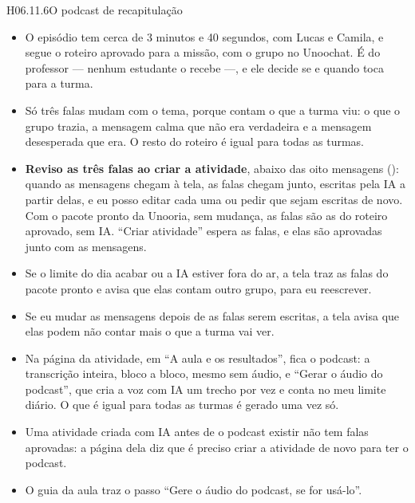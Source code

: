 \begin{historia}{H06.11.6}{O podcast de recapitulação}{\parcial}
\aceite
\begin{itemize}
  \item O episódio tem cerca de 3 minutos e 40 segundos, com Lucas e Camila, e
    segue o roteiro aprovado para a missão, com o grupo no Unoochat. É do
    professor --- nenhum estudante o recebe ---, e ele decide se e quando toca
    para a turma.
  \item Só três falas mudam com o tema, porque contam o que a turma viu: o que
    o grupo trazia, a mensagem calma que não era verdadeira e a mensagem
    desesperada que era. O resto do roteiro é igual para todas as turmas.
  \item \textbf{Reviso as três falas ao criar a atividade}, abaixo das oito
    mensagens (): quando as mensagens chegam à tela, as falas
    chegam junto, escritas pela IA a partir delas, e eu posso editar cada uma
    ou pedir que sejam escritas de novo. Com o pacote pronto da Unooria, sem
    mudança, as falas são as do roteiro aprovado, sem IA. \enquote{Criar
    atividade} espera as falas, e elas são aprovadas junto com as mensagens.
  \item Se o limite do dia acabar ou a IA estiver fora do ar, a tela traz as
    falas do pacote pronto e avisa que elas contam outro grupo, para eu
    reescrever.
  \item Se eu mudar as mensagens depois de as falas serem escritas, a tela
    avisa que elas podem não contar mais o que a turma vai ver.
  \item Na página da atividade, em \enquote{A aula e os resultados}, fica o
    podcast: a transcrição inteira, bloco a bloco, mesmo sem áudio, e
    \enquote{Gerar o áudio do podcast}, que cria a voz com IA um trecho por
    vez e conta no meu limite diário. O que é igual para todas as turmas é
    gerado uma vez só.
  \item Uma atividade criada com IA antes de o podcast existir não tem falas
    aprovadas: a página dela diz que é preciso criar a atividade de novo para
    ter o podcast.
  \item O guia da aula traz o passo \enquote{Gere o áudio do podcast, se for
    usá-lo}.
\end{itemize}
\end{historia}

